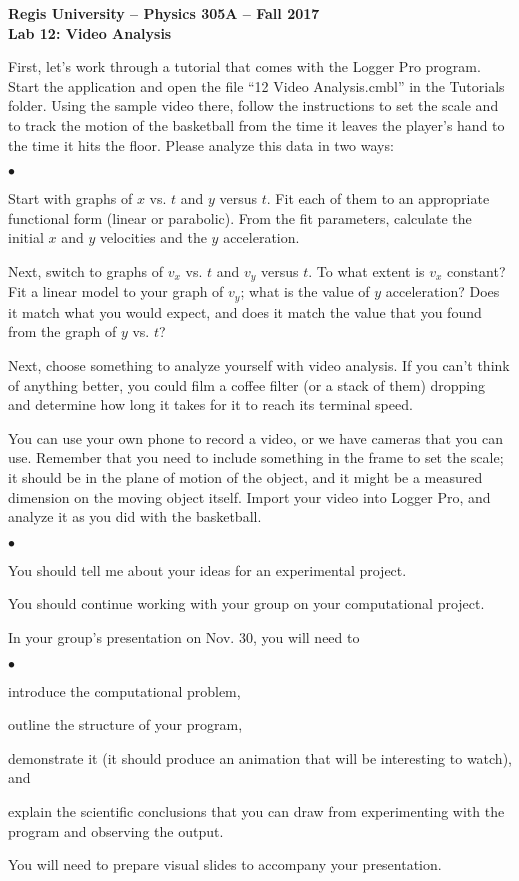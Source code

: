 \documentclass[12pt]{article}
\newcommand{\squishlist}{
   \begin{list}{$\bullet$}
    { \setlength{\itemsep}{0pt}      \setlength{\parsep}{3pt}
      \setlength{\topsep}{3pt}       \setlength{\partopsep}{0pt}
      \setlength{\leftmargin}{1.5em} \setlength{\labelwidth}{1em}
      \setlength{\labelsep}{0.5em} } }
\newcommand{\squishend}{
    \end{list}  }
\begin{document}
\begin{center}
{\bf{Regis University -- Physics 305A -- Fall 2017}} \\
{\bf{Lab 12: Video Analysis}} \\
\end{center}


First, let's work through a tutorial that comes with the Logger Pro program.
Start the application and open the file ``12 Video Analysis.cmbl'' in the 
Tutorials folder.  Using the sample video there, follow the instructions to 
set the scale and to track the motion of the basketball from the time it leaves 
the player's hand to the time it hits the floor.
Please analyze this data in two ways:
\squishlist
\item Start with graphs of $x$ vs. $t$ and $y$ versus $t$.  Fit each of
  them to an appropriate functional form (linear or parabolic).  
  From the fit parameters, calculate the initial $x$ and $y$ velocities and 
  the $y$ acceleration.
\item Next, switch to graphs of $v_x$ vs. $t$ and $v_y$ versus $t$.  To what 
  extent is $v_x$ constant?  Fit a linear model to your graph of $v_y$; 
  what is the value of $y$ acceleration?  Does it match what you 
  would expect, and does it match the value that you found from the graph
  of $y$ vs. $t$?
\squishend

\medskip
{}

Next, choose something to analyze yourself with video analysis.
If you can't think of anything better, you could film a coffee filter (or a
stack of them) dropping and determine how long it takes for it to reach its terminal
speed.  

You can use your own phone to record a video, or we have cameras
that you can use.  Remember that you need to include something in the frame 
to set the scale; it should be in the plane of motion of the object, and it 
might be a measured dimension on the moving object itself.
Import your video into Logger Pro, and analyze it as you did with the
basketball.


\medskip
{}

\squishlist
\item You should tell me about your ideas for an experimental project.
\item You should continue working with your group on your computational project.
\squishend

\medskip
{}

\noindent In your group's presentation on Nov. 30, you will need to 
\squishlist
\item introduce the computational problem, 
\item outline the structure of your program, 
\item demonstrate it (it should produce an animation that will be interesting 
  to watch), and 
\item explain the scientific conclusions that you can draw from experimenting 
  with the program and observing the output.
\squishend
You will need to prepare visual slides to accompany your presentation.
\end{document}
